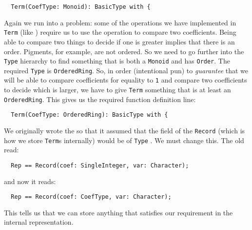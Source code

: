\begin{small}
\begin{verbatim}
  Term(CoefType: Monoid): BasicType with {          
\end{verbatim}
\end{small}

Again we run into a problem: some of the operations we have
implemented in \verb"Term" (like ) require us to
use the \ttin{>}
operation to compare two coefficients. Being able to compare two
things to decide if one is greater implies that there is an order.
Pigments, for example, are not ordered. So we need to go further into
the \verb"Type" hierarchy to find something that is both a \verb"Monoid"
and has \verb"Order". The required \verb"Type" is \verb"OrderedRing".
So, in order (intentional pun)
to {\em guarantee} that we will be able to compare coefficients for equality
to \verb"1" and compare two coefficients to decide which is larger, we have
to give \verb"Term" something that is at least an \verb"OrderedRing". This gives us
the required function definition line:

\begin{small}
\begin{verbatim}
  Term(CoefType: OrderedRing): BasicType with {          
\end{verbatim}
\end{small}

We originally wrote the  so that it assumed that the
 field of the \verb"Record" (which is how we store
\verb"Term"s internally) would be of \verb"Type" .
We must change this. The old  read:

\begin{small}
\begin{verbatim}
  Rep == Record(coef: SingleInteger, var: Character);       
\end{verbatim}
\end{small}

and now it reads:

\begin{small}
\begin{verbatim}
  Rep == Record(coef: CoefType, var: Character);       
\end{verbatim}
\end{small}

This tells us that we can store anything that satisfies our 
requirement in the internal representation.


